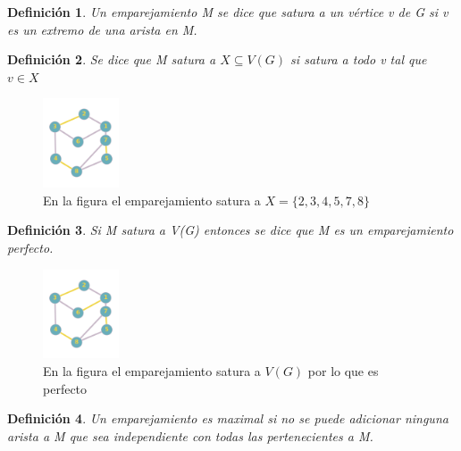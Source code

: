 \documentclass[a4paper,1pt]{report}
\newtheorem*{dfn}{Definición}
\begin{document}
\begin{dfn}
 Un emparejamiento M se dice que satura a un vértice v de G si v es un extremo de una arista en M.
\end{dfn}

\begin{dfn}
 Se dice que M satura a $X\subseteq V(G)$ si satura a todo v tal que $v\in X$
\end{dfn}

\begin{figure}[H]
        \centering
        \includegraphics[width=0.2\textwidth]{figures7/matching.png}
        \caption{En la figura el emparejamiento satura a $X = \{2,3,4,5,7,8\}$}
    \end{figure} 
    
    \begin{dfn}
        Si M satura a V(G) entonces se dice que M es un emparejamiento perfecto.
    \end{dfn}
    
    \begin{figure}[H]
        \centering
        \includegraphics[width=0.2\textwidth]{figures7/maximo.png}
        \caption{En la figura el emparejamiento satura a $V(G)$ por lo que es perfecto}
\end{figure} 


\begin{dfn}
 Un emparejamiento es maximal si no se puede adicionar ninguna arista a M que sea independiente con todas las pertenecientes a M.
\end{dfn}
\end{document}
